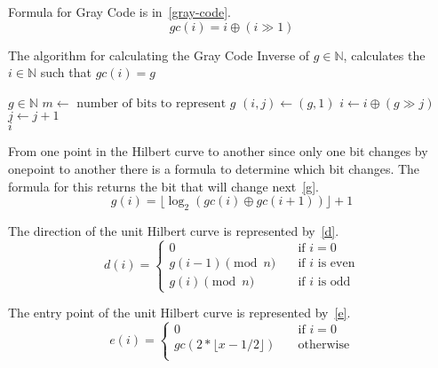 \documentclass[10pt]{article}
\begin{document}
\flushleft
Formula for Gray Code is in~\ref{gray-code}.
\begin{equation}
  \label{gray-code}
  gc(i) = i \oplus \left( i \gg 1 \right) 
\end{equation}

\begin{algorithm}
  \caption{The algorithm for calculating the Gray Code Inverse of $g \in \mathbb{N}$, calculates the $i \in \mathbb{N}$ such that $gc\left( i \right) = g $ }
  \label{gray-code-inverse}
  \begin{algorithmic}[1]
    \Require $g \in \mathbb{N}$ 
    \State $ m \leftarrow \text{ number of bits to represent } g$ 
    \State $ \left( i, j \right) \leftarrow \left( g, 1 \right) $ 
    \State $ i \leftarrow i \oplus \left( g \gg j \right)$ 
    \State $ j \leftarrow j + 1$ 
    \EndWhile \\
    \Return $i$ %
  \end{algorithmic}
\end{algorithm}

From one point in the Hilbert curve to another since only one bit changes by onepoint to another there is a formula to determine which bit changes. The formula for this returns the bit that will change next~\ref{g}.
\begin{equation}
  \label{g}
  g(i) = \lfloor \log _{2} \left( gc(i) \oplus gc(i+1) \right) \rfloor + 1
\end{equation}


The direction of the unit Hilbert curve is represented by~\ref{d}.
\begin{equation}
  \label{d}
  d(i) = 
    \begin{cases}
      0 & \quad \text{if $i = 0$}\\
      g(i - 1) \pmod{n} & \quad \text{if $i$ is even} \\
      g(i) \pmod{n} & \quad \text{if $i$ is odd}
    \end{cases}
\end{equation}

The entry point of the unit Hilbert curve is represented by~\ref{e}.
\begin{equation}
  \label{e}
  e(i) =  
    \begin{cases}
      0 & \quad \text{if $i = 0$}\\
      gc(2 * \lfloor x-1/2 \rfloor) & \quad \text{otherwise} \\
    \end{cases}
\end{equation}
\end{document}
